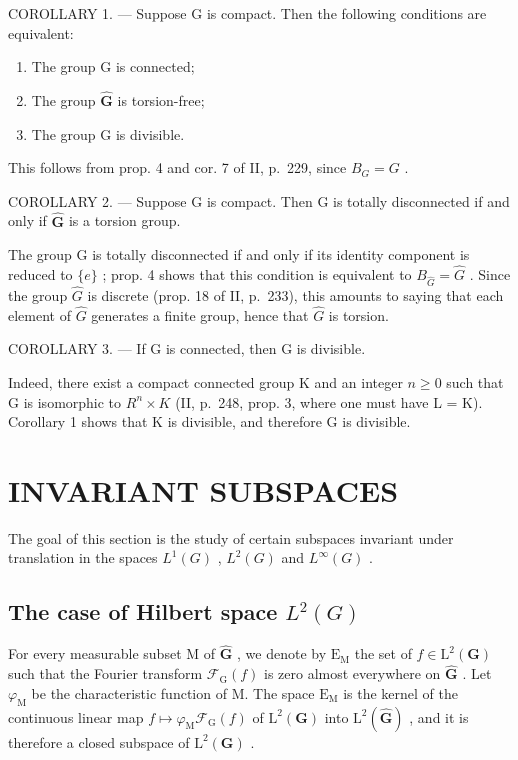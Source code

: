 COROLLARY 1. --- Suppose G is compact. Then the following conditions are equivalent:

\begin{enumerate}
\def\labelenumi{(\roman{enumi})}
\item
  The group G is connected;
\item
  The group \(\widehat{\mathbf{G}}\) is torsion-free;
\item
  The group G is divisible.
\end{enumerate}

This follows from prop. 4 and cor. 7 of II, p.~229, since \(B_{G} = G\) .

COROLLARY 2. --- Suppose G is compact. Then G is totally disconnected if and only if \(\widehat{\mathbf{G}}\) is a torsion group.

The group G is totally disconnected if and only if its identity component is reduced to \(\{e\}\) ; prop. 4 shows that this condition is equivalent to \(B_{\widehat{G}} = \widehat{G}\) . Since the group \(\widehat{G}\) is discrete (prop. 18 of II, p.~233), this amounts to saying that each element of \(\widehat{G}\) generates a finite group, hence that \(\widehat{G}\) is torsion.

COROLLARY 3. --- If G is connected, then G is divisible.

Indeed, there exist a compact connected group K and an integer \(n \geqslant 0\) such that G is isomorphic to \(R^{n} \times K\) (II, p.~248, prop. 3, where one must have L = K). Corollary 1 shows that K is divisible, and therefore G is divisible.

\section{INVARIANT SUBSPACES}

The goal of this section is the study of certain subspaces invariant under translation in the spaces \(L^{1}(G)\) , \(L^{2}(G)\) and \(L^{\infty}(G)\) .

\subsection{\texorpdfstring{The case of Hilbert space \(L^{2}(G)\)}{The case of Hilbert space L\^{}\{2\}(G)}}

For every measurable subset M of \(\widehat{\mathbf{G}}\) , we denote by \(\mathrm{E_M}\) the set of \(f \in \mathrm{L}^2(\mathbf{G})\) such that the Fourier transform \(\mathcal{F}_{\mathrm{G}}(f)\) is zero almost everywhere on \(\widehat{\mathbf{G}}\) . Let \(\varphi_{\mathrm{M}}\) be the characteristic function of M. The space \(\mathrm{E_M}\) is the kernel of the continuous linear map \(f \mapsto \varphi_{\mathrm{M}}\mathcal{F}_{\mathrm{G}}(f)\) of \(\mathrm{L}^2(\mathbf{G})\) into \(\mathrm{L}^2(\widehat{\mathbf{G}})\) , and it is therefore a closed subspace of \(\mathrm{L}^2(\mathbf{G})\) .

